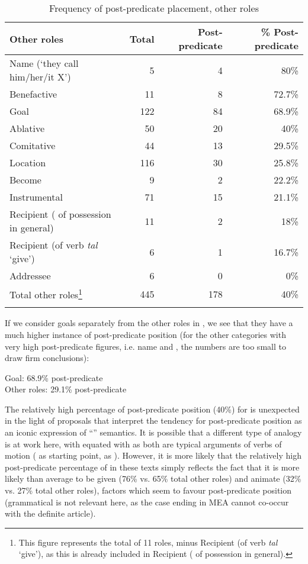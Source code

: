 \documentclass[output=paper,colorlinks,citecolor=brown,draftmode]{langscibook}
\begin{document}
\begin{table}
\begin{tabularx}{\textwidth}{Qrrr}
\lsptoprule
Other roles & Total & Post-predicate & \% Post-predicate \\
\midrule
Name (`they call him/her/it X')    &5&4&80\% \\
Benefactive &11&8&72.7\% \\
Goal&122&84&68.9\% \\
Ablative                                    &50&20&40\% \\
Comitative                                 &44&13&29.5\% \\
Location &116&30&25.8\% \\
Become                                      &9&2&22.2\% \\
Instrumental&71&15&21.1\% \\         
Recipient ( of possession in general)  &11&2           &18\% \\
Recipient (of verb \textit{tal} `give')&6&1 &16.7\% \\
Addressee                                   &6&0          &0\% \\
\midrule
Total other roles\footnote{This figure represents the total of 11 roles, minus Recipient (of verb \textit{tal} `give'), as this is already included in Recipient ( of possession in general).}                         &445&178        &40\% \\
\lspbottomrule
\end{tabularx}
\caption{Frequency of post-predicate placement, other roles}
\label{Armenian:tab:15}
\end{table}

If we consider goals separately from the other roles in , we see that they have a much higher instance of post-predicate position (for the other categories with very high post-predicate figures, i.e. name and , the numbers are too small to draw firm conclusions):

\ea
Goal: 68.9\% post-predicate\\
Other roles: 29.1\% post-predicate
\z
\begin{sloppypar}
The relatively high percentage of post-predicate position (40\%) for  is unexpected in the light of proposals that interpret the tendency for post-predicate position as an iconic expression of ``'' semantics. It is possible that a different type of analogy is at work here, with  equated with  as both are typical arguments of verbs of motion ( as starting point,  as ). However, it is more likely that the relatively high post-predicate percentage of  in these texts simply reflects the fact that it is more likely than average to be given (76\% vs. 65\% total other roles) and animate (32\% vs. 27\% total other roles), factors which seem to favour post-predicate position (grammatical  is not relevant here, as the  case ending in MEA cannot co-occur with the definite article).
\end{sloppypar}
\end{document}
